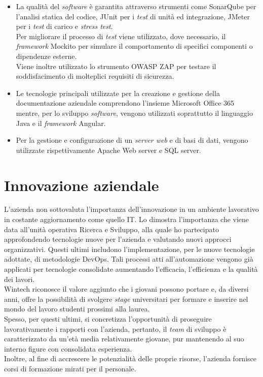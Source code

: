 \begin{itemize}
    \item La qualità del \emph{software} è garantita attraverso strumenti come SonarQube per l'analisi statica del codice, JUnit per i \emph{test} di unità ed integrazione, JMeter per i \emph{test} di carico e \emph{stress test}.\\
    Per migliorare il processo di \emph{test} viene utilizzato, dove necessario, il \emph{framework} Mockito per simulare il comportamento di specifici componenti o dipendenze esterne.\\
    Viene inoltre utilizzato lo strumento OWASP ZAP per testare il soddisfacimento di molteplici requisiti di sicurezza. 
    \item Le tecnologie principali utilizzate per la creazione e gestione della documentazione aziendale comprendono l'insieme Microsoft Office 365 mentre, per lo sviluppo \emph{software}, vengono utilizzati soprattutto il linguaggio Java e il \emph{framework} Angular. 
    \item Per la gestione e configurazione di un \emph{server web} e di basi di dati, vengono utilizzate rispettivamente Apache Web server e SQL server. 
\end{itemize}

\section{Innovazione aziendale}
L'azienda non sottovaluta l'importanza dell'innovazione in un ambiente lavorativo in costante aggiornamento come quello \gls{IT}. Lo dimostra l'importanza che viene data all'\gls{unità operativa} Ricerca e Sviluppo, alla quale ho partecipato approfondendo tecnologie nuove per l'azienda e valutando nuovi approcci organizzativi. Questi ultimi includono l'implementazione, per le nuove tecnologie adottate, di metodologie \gls{DevOps}. Tali processi atti all'automazione vengono già applicati per tecnologie consolidate aumentando l'efficacia, l'efficienza e la qualità dei lavori.\\
Wintech riconosce il valore aggiunto che i giovani possono portare e, da diversi anni, offre la possibilità di svolgere \emph{stage} universitari per formare e inserire nel mondo del lavoro studenti prossimi alla laurea.\\
Spesso, per questi ultimi, si concretizza l'opportunità di proseguire lavorativamente i rapporti con l'azienda, pertanto, il \emph{team} di sviluppo è caratterizzato da un'età media relativamente giovane, pur mantenendo al suo interno figure con consolidata esperienza.\\ 
Inoltre, al fine di accrescere le potenzialità delle proprie risorse, l'azienda fornisce corsi di formazione mirati per il personale.
